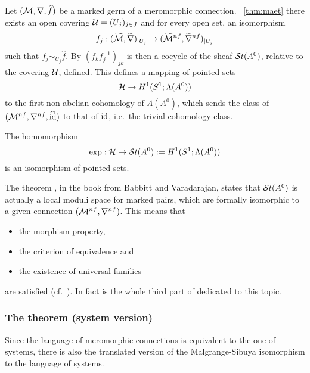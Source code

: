Let $(\mathcal{M},\nabla,\widehat f)$ be a marked germ of a  meromorphic connection.
~\ref{thm:maet} there exists an open covering
$\mathcal{U}=(U_j)_{j\in J}$ and for every open set, an isomorphism
\[
  f_j:(\widetilde{\mathcal{M}},\widetilde\nabla)_{|U_j}
  \to(\widetilde{\mathcal{M}}^{nf},\widetilde\nabla^{nf})_{|U_j}
\]
such that $f_j\sim_{U_j}\hat f$.
By $(f_kf_j^{-1})_{jk}$ is then a cocycle of the sheaf $\mathcal{S}{}t(A^0)$, relative
to the covering $\mathcal{U}$, defined.
This defines a mapping of pointed sets
\[
  \mathcal{H}\to H^1(S^1;\Lambda(A^0))
\]
to the first non abelian cohomology of $\Lambda(A^0)$, which sends the class of
$(\mathcal{M}^{nf},\nabla^{nf},\widehat{\operatorname{id}})$ to that of $\operatorname{id}$, i.e.\ the trivial cohomology
class.

\begin{tthm} \label{thm:mainThm1MeromVersion}
  The homomorphism
  \[
    \exp:\mathcal{H}\to\mathcal{S}{}t(A^0):=H^1(S^1;\Lambda(A^0))
  \]
  is an isomorphism of pointed sets.
\end{tthm}
\begin{rem}
  The theorem \cite[Thm.III.1.1.2]{babbitt1989local}, in the book from
  Babbitt and Varadarajan, states that $\mathcal{S}{}t(A^0)$
  is actually a local moduli space for marked pairs, which are formally
  isomorphic to a given connection $(\mathcal{M}^{nf},\nabla^{nf})$. This means that
  \begin{itemize}
    \item the morphism property,
    \item the criterion of equivalence and
    \item the existence of universal families
  \end{itemize}
  are satisfied (cf.\ \cite[169]{babbitt1989local}).
  In fact is the whole third part of \cite{babbitt1989local} dedicated to this
  topic.
\end{rem}

\subsubsection{The theorem (system version)}
Since the language of meromorphic connections is equivalent to the one of
systems, there is also the translated version of the Malgrange-Sibuya
isomorphism to the language of systems.

